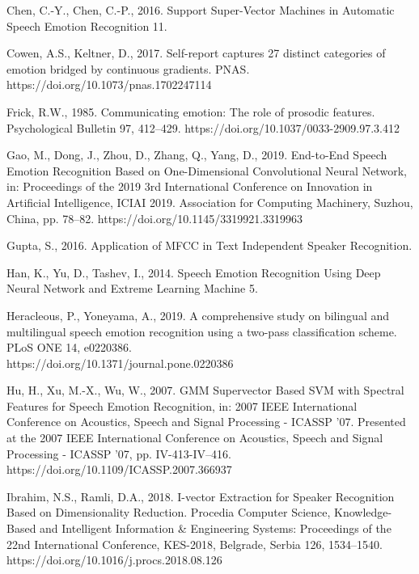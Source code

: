 \small
\hangindent=0.5cm
Chen, C.-Y., Chen, C.-P., 2016. Support Super-Vector Machines in Automatic Speech Emotion Recognition 11.

\small
\hangindent=0.5cm
Cowen, A.S., Keltner, D., 2017. Self-report captures 27 distinct categories of emotion bridged by continuous gradients. PNAS. https://doi.org/10.1073/pnas.1702247114

\small
\hangindent=0.5cm
Frick, R.W., 1985. Communicating emotion: The role of prosodic features. Psychological Bulletin 97, 412–429. https://doi.org/10.1037/0033-2909.97.3.412

\small
\hangindent=0.5cm
Gao, M., Dong, J., Zhou, D., Zhang, Q., Yang, D., 2019. End-to-End Speech Emotion Recognition Based on One-Dimensional Convolutional Neural Network, in: Proceedings of the 2019 3rd International Conference on Innovation in Artificial Intelligence, ICIAI 2019. Association for Computing Machinery, Suzhou, China, pp. 78–82. https://doi.org/10.1145/3319921.3319963

\small
\hangindent=0.5cm
Gupta, S., 2016. Application of MFCC in Text Independent Speaker Recognition.

\small
\hangindent=0.5cm
Han, K., Yu, D., Tashev, I., 2014. Speech Emotion Recognition Using Deep Neural Network and Extreme Learning Machine 5.

\small
\hangindent=0.5cm
Heracleous, P., Yoneyama, A., 2019. A comprehensive study on bilingual and multilingual speech emotion recognition using a two-pass classification scheme. PLoS ONE 14, e0220386. \\https://doi.org/10.1371/journal.pone.0220386

\small
\hangindent=0.5cm
Hu, H., Xu, M.-X., Wu, W., 2007. GMM Supervector Based SVM with Spectral Features for Speech Emotion Recognition, in: 2007 IEEE International Conference on Acoustics, Speech and Signal Processing - ICASSP ’07. Presented at the 2007 IEEE International Conference on Acoustics, Speech and Signal Processing - ICASSP ’07, pp. IV-413-IV–416. https://doi.org/10.1109/ICASSP.2007.366937

\small
\hangindent=0.5cm
Ibrahim, N.S., Ramli, D.A., 2018. I-vector Extraction for Speaker Recognition Based on Dimensionality Reduction. Procedia Computer Science, Knowledge-Based and Intelligent Information \& Engineering Systems: Proceedings of the 22nd International Conference, KES-2018, Belgrade, Serbia 126, 1534–1540. \\https://doi.org/10.1016/j.procs.2018.08.126

